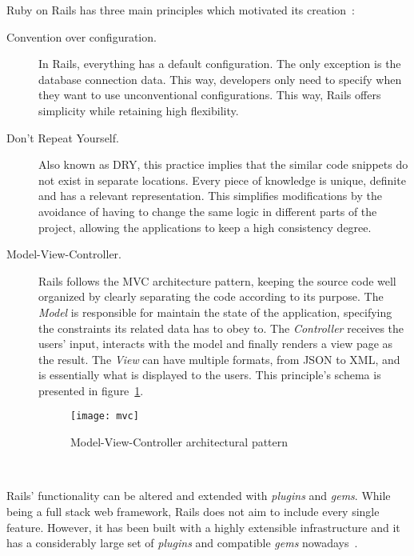 Ruby on Rails has three main principles which motivated its creation~\cite{agile_webdevelopment_with_rails, ruby_on_rails_principles}:
\begin{description}
\item[Convention over configuration.] In Rails, everything has a default configuration. The only exception is the database connection data. This way, developers only need to specify when they want to use unconventional configurations. This way, Rails offers simplicity while retaining high flexibility.
\item[Don't Repeat Yourself.] Also known as DRY, this practice implies that the similar code snippets do not exist in separate locations. Every piece of knowledge is unique, definite and has a relevant representation. This simplifies modifications by the avoidance of having to change the same logic in different parts of the project, allowing the applications to keep a high consistency degree.
\item[Model-View-Controller.] Rails follows the MVC architecture pattern, keeping the source code well organized by clearly separating the code according to its purpose. The \textit{Model} is responsible for maintain the state of the application, specifying the constraints its related data has to obey to. The \textit{Controller} receives the users' input, interacts with the model and finally renders a view page as the result. The \textit{View} can have multiple formats, from JSON to XML, and is essentially what is displayed to the users. This principle's schema is presented in figure~\ref{fig:mvc}.
\begin{figure}[h]
  \centering
    \texttt{[image: mvc]}
  \caption{Model-View-Controller architectural pattern}
  \label{fig:mvc}
\end{figure}\\
\end{description}
Rails' functionality can be altered and extended with \textit{plugins} and \textit{gems}. While being a full stack web framework, Rails does not aim to include every single feature. However, it has been built with a highly extensible infrastructure and it has a considerably large set of \textit{plugins} and compatible \textit{gems} nowadays~\cite{rails_magazine_1}.



